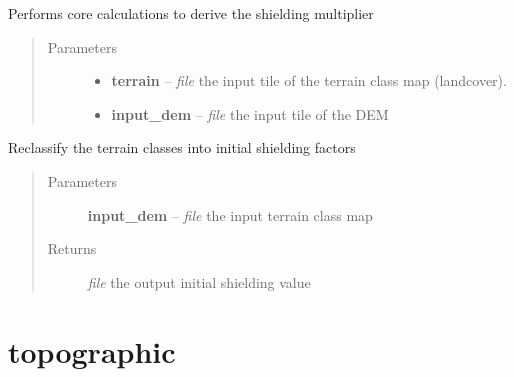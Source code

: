 \documentclass[letterpaper,10pt,english]{sphinxmanual}
\begin{document}
\begin{fulllineitems}
\label{docs/shielding:shield_mult.shield}
Performs core calculations to derive the shielding multiplier
\begin{quote}\begin{description}
\item[{Parameters}] \leavevmode\begin{itemize}
\item {} 
\textbf{terrain} -- \emph{file} the input tile of the terrain class map (landcover).

\item {} 
\textbf{input\_dem} -- \emph{file} the input tile of the DEM

\end{itemize}

\end{description}\end{quote}

\end{fulllineitems}



\begin{fulllineitems}
\label{docs/shielding:shield_mult.terrain_class2ms_orig}
Reclassify the terrain classes into initial shielding factors
\begin{quote}\begin{description}
\item[{Parameters}] \leavevmode
\textbf{input\_dem} -- \emph{file} the input terrain class map

\item[{Returns}] \leavevmode
\emph{file} the output initial shielding value

\end{description}\end{quote}

\end{fulllineitems}



\section{topographic}
\label{docs/topographic:topographic}\label{docs/topographic::doc}
\end{document}
